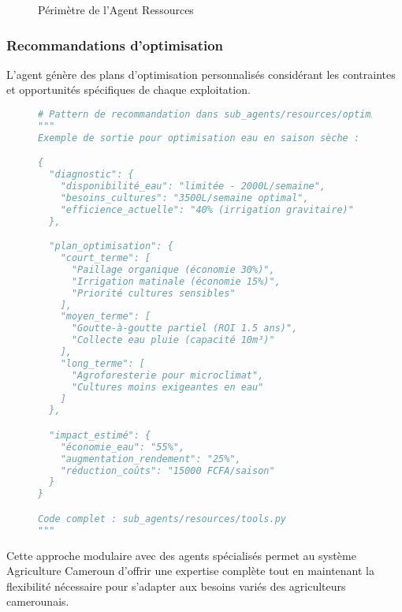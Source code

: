 \begin{figure}[h]
\centering
{}
\caption{Périmètre de l'Agent Ressources}
\end{figure}

\subsubsection{Recommandations d'optimisation}

L'agent génère des plans d'optimisation personnalisés considérant les contraintes et opportunités spécifiques de chaque exploitation.

\begin{figure}[h]
\centering
\begin{lstlisting}[language=Python, caption=Exemple de recommandation intégrée]
# Pattern de recommandation dans sub_agents/resources/optimizer.py
"""
Exemple de sortie pour optimisation eau en saison sèche :

{
  "diagnostic": {
    "disponibilité_eau": "limitée - 2000L/semaine",
    "besoins_cultures": "3500L/semaine optimal",
    "efficience_actuelle": "40% (irrigation gravitaire)"
  },

  "plan_optimisation": {
    "court_terme": [
      "Paillage organique (économie 30%)",
      "Irrigation matinale (économie 15%)",
      "Priorité cultures sensibles"
    ],
    "moyen_terme": [
      "Goutte-à-goutte partiel (ROI 1.5 ans)",
      "Collecte eau pluie (capacité 10m³)"
    ],
    "long_terme": [
      "Agroforesterie pour microclimat",
      "Cultures moins exigeantes en eau"
    ]
  },

  "impact_estimé": {
    "économie_eau": "55%",
    "augmentation_rendement": "25%",
    "réduction_coûts": "15000 FCFA/saison"
  }
}

Code complet : sub_agents/resources/tools.py
"""
\end{lstlisting}
\end{figure}

Cette approche modulaire avec des agents spécialisés permet au système Agriculture Cameroun d'offrir une expertise complète tout en maintenant la flexibilité nécessaire pour s'adapter aux besoins variés des agriculteurs camerounais.
